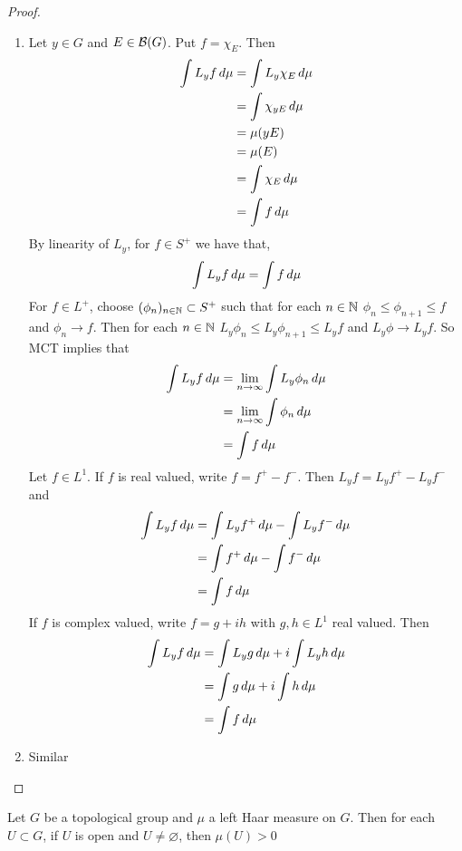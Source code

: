 \documentclass{book}
\begin{document}
	\begin{proof}\
		\begin{enumerate}
			\item Let $y \in G$ and $E \in \mathcal{B}(G)$. Put $f = \chi_E$. Then 
			\begin{align*}
				\int L_y f \, d \mu 
				& = \int L_y\chi_E \, d \mu \\
				& =  \int \chi_{yE} \, d \mu \\
				& = \mu(yE) \\
				& = \mu(E) \\
				& = \int \chi_E \, d \mu \\
				& = \int f \, d \mu
			\end{align*} 
			By linearity of $L_y$, for $f \in S^+$ we have that, $$\int L_y f \, d \mu = \int f \, d \mu$$ For $f \in L^+$, choose $(\phi_{n})_{n \in \mathbb{N}} \subset S^+$ such that for each $n \in \mathbb{N}$ $\phi_n \leq \phi_{n+1} \leq f$ and $\phi_n \rightarrow f$. Then for each $n \in \mathbb{N}$ $L_y \phi_n \leq L_y \phi_{n+1} \leq L_y f$ and $L_y \phi \rightarrow L_y f$. So MCT implies that 
			\begin{align*}
				\int L_y f \, d \mu 
				& = \lim \limits_{n \rightarrow \infty} \int L_y \phi_n \, d \mu \\
				& = \lim \limits_{n \rightarrow \infty} \int \phi_n \, d \mu \\
				& = \int f \, d \mu \\
			\end{align*}
			Let $f \in L^1$. If $f$ is real valued, write $f = f^+ - f^-$. Then $L_y f = L_y f^+ - L_y f^-$ and 
			\begin{align*}
				\int L_yf \, d \mu 
				& = \int L_y f^+ \, d \mu - \int L_y f^- \, d \mu \\
				& = \int f^+ \, d \mu - \int f^- \, d \mu \\
				& = \int f \, d \mu
			\end{align*}
			If $f$ is complex valued, write $f = g + ih$ with $g, h \in L^1$ real valued. Then 
			\begin{align*}
				\int L_yf \, d \mu 
				& = \int L_y g \, d \mu + i \int L_y h \, d \mu \\
				& = \int g \, d \mu +i \int h \, d \mu \\
				& = \int f \, d \mu
			\end{align*}
			\item Similar
		\end{enumerate}
	\end{proof}
	
	\begin{ex}  
		Let $G$ be a topological group and $\mu$ a left Haar measure on $G$. Then for each $U \subset G$, if $U$ is open and $U \neq \varnothing$, then $\mu(U) > 0$
	\end{ex}
\end{document}

